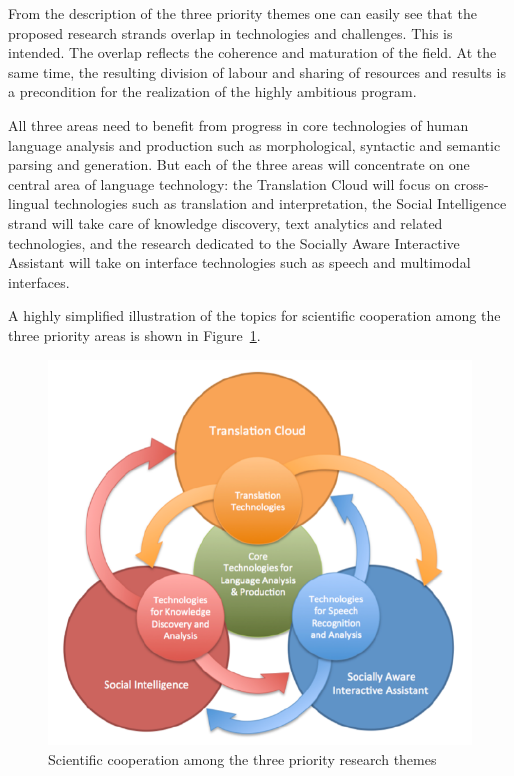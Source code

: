 \documentclass[10pt, plain]{../../metanetpaper}
\begin{document}
\begin{multicols}{2}
From the description of the three priority themes one can easily see that the proposed research strands overlap in technologies and challenges. This is intended. The overlap reflects the coherence and maturation of the field. At the same time, the resulting division of labour and sharing of resources and results is a precondition for the realization of the highly ambitious program.
 
All three areas need to benefit from progress in core technologies of human language analysis and production such as morphological, syntactic and semantic parsing and generation. But each of the three areas will concentrate on one central area of language technology: the Translation Cloud will focus on cross-lingual technologies such as translation and interpretation, the Social Intelligence strand will take care of knowledge discovery, text analytics and related technologies, and the research dedicated to the Socially Aware Interactive Assistant will take on interface technologies such as speech and multimodal interfaces.
 
A highly simplified illustration of the topics for scientific cooperation among the three priority areas is shown in Figure~\ref{fig:priority-themes}.

\begin{figure}[htb]
  \center
  \includegraphics[width=\textwidth]{../_media/PT-Rings}
  \caption{Scientific cooperation among the three priority research themes}
  \label{fig:priority-themes}
\end{figure}


\end{multicols}
\end{document}

